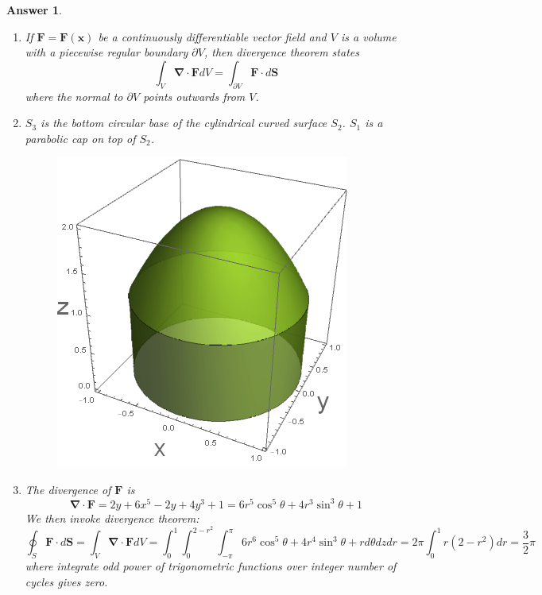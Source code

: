 \documentclass[a4paper]{article}
\newtheorem{ans}{Answer}[section]
\theoremstyle{new}
\begin{document}
\begin{ans}\leavevmode
\begin{enumerate}[label=(\alph*)]
    \item If $\mathbf{F}=\mathbf{F}(\mathbf{x})$ be a continuously differentiable vector field and $V$ is a volume with a piecewise regular boundary $\partial V$, then divergence theorem states
$$\int_V\boldsymbol{\nabla}\cdot\mathbf{F}dV=\int_{\partial V}\mathbf{F}\cdot d\mathbf{S}$$
where the normal to $\partial V$ points outwards from $V$.
\item $S_3$ is the bottom circular base of the cylindrical curved surface $S_2$. $S_1$ is a parabolic cap on top of $S_2$.
\begin{figure}[H]
    \centering
    \includegraphics[scale=0.5]{2016P1Q1.png}
\end{figure}
\item The divergence of $\mathbf{F}$ is
$$\boldsymbol{\nabla}\cdot\mathbf{F}=2y+6x^5-2y+4y^3+1=6r^5\cos^5\theta+4r^3\sin^3\theta+1$$ We then invoke divergence theorem:
$$\oint_S\mathbf{F}\cdot d\mathbf{S}=\int_V\boldsymbol{\nabla}\cdot\mathbf{F}dV=\int_0^1\int_0^{2-r^2}\int_{-\pi}^\pi 6r^6\cos^5\theta+4r^4\sin^3\theta+r d\theta dzdr=2\pi\int_0^1r(2-r^2)dr=\frac{3}{2}\pi$$
where integrate odd power of trigonometric functions over integer number of cycles gives zero.
\end{enumerate}

\end{ans}
\newpage
\end{document}
